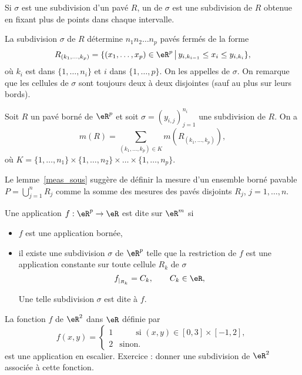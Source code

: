 \begin{definition}
	Si \( \sigma\) est une subdivision d'un pavé \( R\), un  de \( \sigma\) est une subdivision de \( R\) obtenue en fixant plus de points dans chaque intervalle.
\end{definition}

La subdivision \( \sigma\) de \( R\) détermine \( n_1n_2\ldots n_p\) pavés fermés de la forme
\[
	R_{(k_1,\ldots,k_p)}=\{(x_1,\ldots, x_p)\in\eR^p\,\big\vert\, y_{i,k_{i-1}}\leq x_i\leq y_{i,k_i}\},
\]
où \( k_i\) est dans \( \{1,\ldots, n_i\}\) et \( i\) dans \( \{1,\ldots, p\}\). On les appelles  de \( \sigma\). On remarque que les cellules de \( \sigma\) sont toujours deux à deux disjointes (sauf au plus sur leurs bords).
\begin{lemma}\label{meas_sous}
	Soit \( R\) un pavé borné de \( \eR^p\) et soit \( \sigma=(y_{i,j})_{j=1}^{n_i}\) une subdivision de \( R\).
	On a
	\[
		m(R)=\sum_{(k_1,\ldots,k_p)\in K} m(R_{(k_1,\ldots,k_p)}),
	\]
	où \( K=\{1,\ldots,n_1\}\times\{1,\ldots,n_2\}\times\ldots \times\{1,\ldots,n_p\}\).
\end{lemma}
Le lemme~\ref{meas_sous} suggère de définir la mesure d'un ensemble borné pavable \( P=\bigcup_{j=1}^{n}R_j\) comme la somme des mesures des pavés disjoints \( R_j\), \( j=1,\ldots, n\).
\begin{definition}
	Une application \( f:\eR^p\to\eR\) est dite  sur \( \eR^m\) si
	\begin{itemize}
		\item \( f\) est une application bornée,
		\item il existe une subdivision \( \sigma\) de \( \eR^p\) telle que la restriction de \( f\)  est une application constante sur toute cellule \( R_k\) de \( \sigma\)
		      \[
			      f_{\vert_{R_k}}=C_k, \qquad C_k\in\eR,
		      \]

		      Une telle subdivision \( \sigma\) est dite  à \( f\).
	\end{itemize}
\end{definition}
\begin{example}
	La fonction \( f\) de \( \eR^2\) dans \( \eR\) définie par
	\begin{equation}
		f(x,y)=\left\{
		\begin{array}{ll}
			1 & \qquad \textrm{si } (x,y) \in [0,3]\times[-1,2], \\
			2 & \textrm{sinon.}
		\end{array}\right.
	\end{equation}
	est une application en escalier. Exercice : donner une subdivision de \( \eR^2\) associée à cette fonction.
\end{example}

